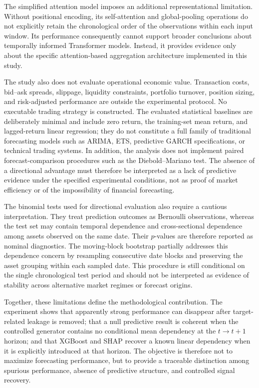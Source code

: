 \documentclass[utf8]{FrontiersinHarvard} %
\newcommand{\rev}[1]{{\color{red}#1}}
\begin{document}
The simplified attention model imposes an additional representational limitation. Without positional encoding, its self-attention and global-pooling operations do not explicitly retain the chronological order of the observations within each input window. Its performance consequently cannot support broader conclusions about temporally informed Transformer models. Instead, it provides evidence only about the specific attention-based aggregation architecture implemented in this study.

The study also does not evaluate operational economic value. Transaction costs, bid--ask spreads, slippage, liquidity constraints, portfolio turnover, position sizing, and risk-adjusted performance are outside the experimental protocol. No executable trading strategy is constructed. \rev{The evaluated statistical baselines are deliberately minimal and include zero return, the training-set mean return, and lagged-return linear regression; they do not constitute a full family of traditional forecasting models such as ARIMA, ETS, predictive GARCH specifications, or technical trading systems.} In addition, the analysis does not implement paired forecast-comparison procedures such as the Diebold--Mariano test. The absence of a directional advantage must therefore be interpreted as a lack of predictive evidence under the specified experimental conditions, not as proof of market efficiency or of the impossibility of financial forecasting.

The binomial tests used for directional evaluation also require a cautious interpretation. They treat prediction outcomes as Bernoulli observations, whereas the test set may contain temporal dependence and cross-sectional dependence among assets observed on the same date. Their \(p\)-values are therefore reported as nominal diagnostics. \rev{The moving-block bootstrap partially addresses this dependence concern by resampling consecutive date blocks and preserving the asset grouping within each sampled date. This procedure is still conditional on the single chronological test period and should not be interpreted as evidence of stability across alternative market regimes or forecast origins.}

Together, these limitations define the methodological contribution. The experiment shows that apparently strong performance can disappear after target-related leakage is removed; that a null predictive result is coherent when the controlled generator contains no conditional mean dependency at the \(t\rightarrow t+1\) horizon; and that XGBoost and SHAP recover a known linear dependency when it is explicitly introduced at that horizon. The objective is therefore not to maximize forecasting performance, but to provide a traceable distinction among spurious performance, absence of predictive structure, and controlled signal recovery.
\end{document}
